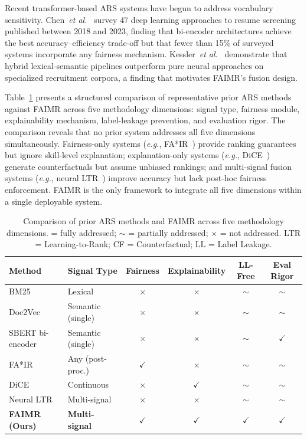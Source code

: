 \documentclass[smallcondensed,numbers]{sn-jnl}
\begin{document}
Recent transformer-based ARS systems have begun to address vocabulary sensitivity. Chen~\textit{et al.}~\cite{chen2023automated} survey 47 deep learning approaches to resume screening published between 2018 and 2023, finding that bi-encoder architectures achieve the best accuracy--efficiency trade-off but that fewer than 15\% of surveyed systems incorporate any fairness mechanism. Kessler~\textit{et al.}~\cite{kessler2018algorithm} demonstrate that hybrid lexical-semantic pipelines outperform pure neural approaches on specialized recruitment corpora, a finding that motivates FAIMR's fusion design.

Table~\ref{tab:prior_comparison} presents a structured comparison of representative prior ARS methods against FAIMR across five methodology dimensions: signal type, fairness module, explainability mechanism, label-leakage prevention, and evaluation rigor. The comparison reveals that no prior system addresses all five dimensions simultaneously. Fairness-only systems (\textit{e.g.}, FA*IR~\cite{zehlike2017fa}) provide ranking guarantees but ignore skill-level explanation; explanation-only systems (\textit{e.g.}, DiCE~\cite{mothilal2020dice}) generate counterfactuals but assume unbiased rankings; and multi-signal fusion systems (\textit{e.g.}, neural LTR~\cite{chen2023automated}) improve accuracy but lack post-hoc fairness enforcement. FAIMR is the only framework to integrate all five dimensions within a single deployable system.

\begin{table}[t]
\centering
\caption{Comparison of prior ARS methods and FAIMR across five methodology dimensions. \checkmark = fully addressed; $\sim$ = partially addressed; $\times$ = not addressed. LTR = Learning-to-Rank; CF = Counterfactual; LL = Label Leakage.}
\label{tab:prior_comparison}
\small\setlength{\tabcolsep}{5pt}%
\begin{tabular}{lp{2.4cm}cccc}
\toprule
Method & Signal Type & Fairness & Explainability & LL-Free & Eval Rigor \\
\midrule
BM25~\cite{robertson2009probabilistic} & Lexical & $\times$ & $\times$ & $\sim$ & $\sim$ \\
Doc2Vec~\cite{le2014doc2vec} & Semantic (single) & $\times$ & $\times$ & $\sim$ & $\sim$ \\
SBERT bi-encoder~\cite{reimers2019sbert} & Semantic (single) & $\times$ & $\times$ & $\sim$ & $\checkmark$ \\
FA*IR~\cite{zehlike2017fa} & Any (post-proc.) & $\checkmark$ & $\times$ & $\sim$ & $\sim$ \\
DiCE~\cite{mothilal2020dice} & Continuous & $\times$ & $\checkmark$ & $\sim$ & $\sim$ \\
Neural LTR~\cite{chen2023automated} & Multi-signal & $\times$ & $\times$ & $\sim$ & $\sim$ \\
\textbf{FAIMR (Ours)} & \textbf{Multi-signal} & $\checkmark$ & $\checkmark$ & $\checkmark$ & $\checkmark$ \\
\bottomrule
\end{tabular}
\end{table}
\end{document}
